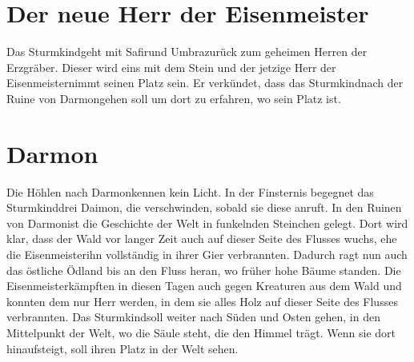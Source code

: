 \documentclass[12pt,a4paper,onecolumn,twoside,ngerman]{book}
\newcommand{\Sturmkind}{Sturmkind}
\newcommand{\Daimon}{Daimon}
\newcommand{\Umbra}{Umbra}
\newcommand{\Darmon}{Darmon}
\newcommand{\Eisenmeister}{Eisenmeister}
\newcommand{\Safir}{Safir}
\begin{document}
\section{Der neue Herr der \Eisenmeister}
Das \Sturmkind geht mit \Safir und \Umbra zurück zum geheimen Herren der Erzgräber. Dieser wird eins mit dem Stein und der jetzige Herr der \Eisenmeister nimmt seinen Platz sein. Er verkündet, dass das \Sturmkind nach der Ruine von \Darmon gehen soll um dort zu erfahren, wo sein Platz ist.

\section{\Darmon}
Die Höhlen nach \Darmon kennen kein Licht. In der Finsternis begegnet das \Sturmkind drei \Daimon, die verschwinden, sobald sie diese anruft.
In den Ruinen von \Darmon ist die Geschichte der Welt in funkelnden Steinchen gelegt. Dort wird klar, dass der Wald vor langer Zeit auch auf dieser Seite des Flusses wuchs, ehe die \Eisenmeister ihn vollständig in ihrer Gier verbrannten. Dadurch ragt nun auch das östliche Ödland bis an den Fluss heran, wo früher hohe Bäume standen. Die \Eisenmeister kämpften in diesen Tagen auch gegen Kreaturen aus dem Wald und konnten dem nur Herr werden, in dem sie alles Holz auf dieser Seite des Flusses verbrannten. Das \Sturmkind soll weiter nach Süden und Osten gehen, in den Mittelpunkt der Welt, wo die Säule steht, die den Himmel trägt. Wenn sie dort hinaufsteigt, soll ihren Platz in der Welt sehen.
\end{document}
